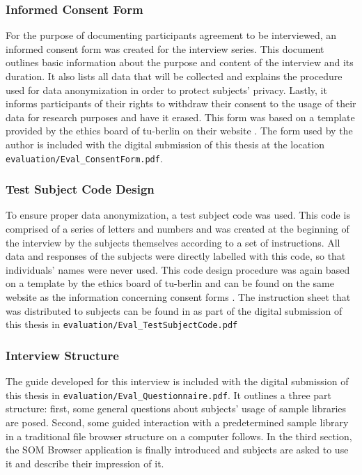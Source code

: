 \subsubsection{Informed Consent Form}
\label{subsubsec:consent_form}
For the purpose of documenting participants agreement to be interviewed, an
informed consent form was created for the interview series. This document
outlines basic information about the purpose and content of the interview and
its duration. It also lists all data that will be collected and explains the
procedure used for data anonymization in order to protect subjects' privacy.
Lastly, it informs participants of their rights to withdraw their consent to the
usage of their data for research purposes and have it erased. This form was
based on a template provided by the ethics board of \gls{tu-berlin} on
their website \citep{web:ethics2019}. The form used by the author is included
with the digital submission of this thesis at the location
\texttt{evaluation/Eval\_ConsentForm.pdf}.

\subsubsection{Test Subject Code Design}
\label{subsubsec:subject_code}
To ensure proper data anonymization, a test subject code was used. This code is
comprised of a series of letters and numbers and was created at the beginning of
the interview by the subjects themselves according to a set of instructions. All
data and responses of the subjects were directly labelled with this code, so
that individuals' names were never used. This code design procedure was again
based on a template by the ethics board of \gls{tu-berlin} and can be found on
the same website as the information concerning consent forms
\citep{web:ethics2019}. The instruction sheet that was distributed to subjects
can be found in as part of the digital submission of this thesis in
\texttt{evaluation/Eval\_TestSubjectCode.pdf}

\subsubsection{Interview Structure}
\label{subsubsec:interview_structure}
The guide developed for this interview is included with the digital submission
of this thesis in \texttt{evaluation/Eval\_Questionnaire.pdf}. It outlines a
three part structure: first, some general questions about subjects' usage of
sample libraries are posed. Second, some guided interaction with a predetermined
sample library in a traditional file browser structure on a computer follows. In
the third section, the SOM Browser application is finally introduced and
subjects are asked to use it and describe their impression of it.

